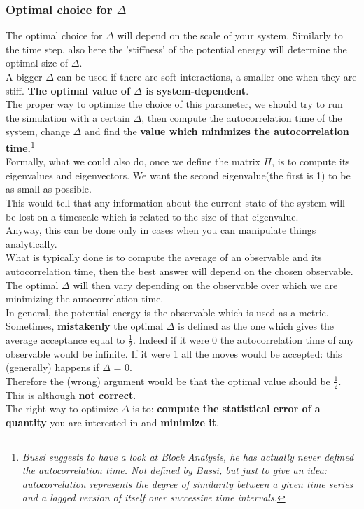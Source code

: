 \subsubsection{Optimal choice for $\Delta$}
The optimal choice for $\Delta$ will depend on the scale of your system. Similarly to the time step, also here the 'stiffness' of the potential energy will determine the optimal size of $\Delta$.\\
A bigger $\Delta$ can be used if there are soft interactions, a smaller one when they are stiff. \textbf{The optimal value of $\Delta$ is system-dependent}.\\
The proper way to optimize the choice of this parameter, we should try to run the simulation with a certain $\Delta$, then compute the autocorrelation time of the system, change $\Delta$ and find the \textbf{value which minimizes the autocorrelation time.}\footnote{\textit{Bussi suggests to have a look at Block Analysis, he has actually never defined the autocorrelation time. Not defined by Bussi, but just to give an idea: \emph{autocorrelation represents the degree of similarity between a given time series and a lagged version of itself over successive time intervals.}}}\\
Formally, what we could also do, once we define the matrix $\Pi$, is to compute its eigenvalues and eigenvectors. We want the second eigenvalue(the first is 1) to be as small as possible.\\
This would tell that any information about the current state of the system will be lost on a timescale which is related to the size of that eigenvalue.\\
Anyway, this can be done only in cases when you can manipulate things analytically.\\
What is typically done is to compute the average of an observable and its autocorrelation time, then the best answer will depend on the chosen observable.\\
The optimal $\Delta$ will then vary depending on the observable over which we are minimizing the autocorrelation time.\\
In general, the potential energy is the observable which is used as a metric.\\
Sometimes, \textbf{mistakenly} the optimal $\Delta$ is defined as the one which gives the average acceptance equal to $\frac{1}{2}$. Indeed if it were 0 the autocorrelation time of any observable would be infinite. If it were 1 all the moves would be accepted: this (generally) happens if $\Delta$ = 0.\\
Therefore the (wrong) argument would be that the optimal value should be $\frac{1}{2}$. This is although \textbf{not correct}.\\
The right way to optimize $\Delta$ is to: \textbf{compute the statistical error of a quantity} you are interested in and \textbf{minimize it}.

